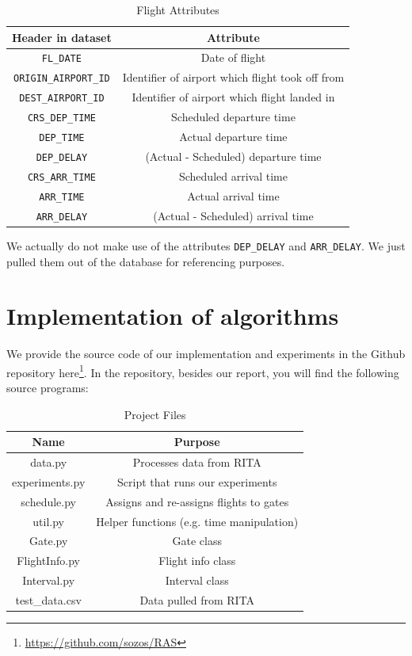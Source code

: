 \documentclass[12pt, a4paper]{report}
\begin{document}
\label{tab: RITA}
\begin{table}[h!]
\center
\begin{tabular}{|c|c|}
\hline
Header in dataset & Attribute\\
\hline
\texttt{FL\_DATE} & Date of flight\\
\texttt{ORIGIN\_AIRPORT\_ID} & Identifier of airport which flight took off from\\
\texttt{DEST\_AIRPORT\_ID} & Identifier of airport which flight landed in\\
\texttt{CRS\_DEP\_TIME} & Scheduled departure time\\
\texttt{DEP\_TIME} & Actual departure time\\
\texttt{DEP\_DELAY} & (Actual - Scheduled) departure time\footnotemark{}\\
\texttt{CRS\_ARR\_TIME} & Scheduled arrival time\\
\texttt{ARR\_TIME} & Actual arrival time\\
\texttt{ARR\_DELAY} & (Actual - Scheduled) arrival time\footnotemark{}\\
\hline
\end{tabular}
\caption{Flight Attributes}
\end{table}

We actually do not make use of the attributes \texttt{DEP\_DELAY} and \texttt{ARR\_DELAY}. We just pulled them out of the database for referencing purposes.

\section{Implementation of algorithms}
We provide the source code of our implementation and experiments in the Github repository here\footnote{\url{https://github.com/sozos/RAS}}. In the repository, besides our report, you will find the following source programs:

\begin{table}[h!]
\center
\begin{tabular}{|c|c|}
\hline
Name & Purpose\\
\hline
data.py & Processes data from RITA\\
experiments.py & Script that runs our experiments\\
schedule.py & Assigns and re-assigns flights to gates\\
util.py & Helper functions (e.g. time manipulation)\\
Gate.py & Gate class\\
FlightInfo.py & Flight info class\\
Interval.py & Interval class\\
test\_data.csv & Data pulled from RITA\\
\hline
\end{tabular}
\caption{Project Files}
\end{table}
\end{document}
